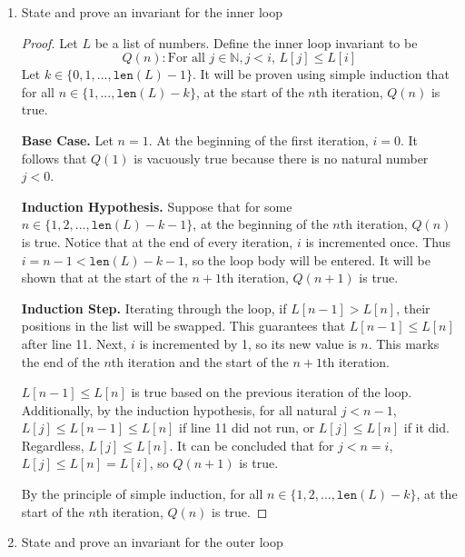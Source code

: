 \documentclass[11pt]{article}
\begin{document}
    \begin{enumerate}[label=(\alph*)]
        \item State and prove an invariant for the inner loop
        
        \begin{proof}
            Let \(L\) be a list of numbers. Define the inner loop invariant to be
            \[
                Q(n): \text{For all } j \in \mathbb{N}, j < i \text{, } L[j] \leq L[i]
            \]
            Let \(k \in \{0,1,..., \texttt{len}(L) - 1\}\). It will be proven using simple induction that for all \(n \in \{1, ..., \texttt{len}(L) - k\}\), at the start of the \(n\)th iteration, \(Q(n)\) is true.

            \textbf{Base Case.} Let \(n=1\). At the beginning of the first iteration, \(i = 0\). It follows that \(Q(1)\) is vacuously true because there is no natural number \(j < 0\).

            \textbf{Induction Hypothesis.} Suppose that for some \(n \in \{1, 2,..., \texttt{len}(L)-k-1\}\), at the beginning of the \(n\)th iteration, \(Q(n)\) is true. Notice that at the end of every iteration, \(i\) is incremented once. Thus \(i = n - 1 < \texttt{len}(L) - k - 1\), so the loop body will be entered. It will be shown that at the start of the \(n+1\)th iteration, \(Q(n+1)\) is true.

            \textbf{Induction Step.} Iterating through the loop, if \(L[n-1] > L[n]\), their positions in the list will be swapped. This guarantees that \(L[n-1] \leq L[n]\) after line 11. Next, \(i\) is incremented by 1, so its new value is \(n\). This marks the end of the \(n\)th iteration and the start of the \(n+1\)th iteration.

            \(L[n-1] \leq L[n]\) is true based on the previous iteration of the loop. Additionally, by the induction hypothesis, for all natural \(j < n-1\), \(L[j] \leq L[n-1] \leq L[n]\) if line 11 did not run, or \(L[j] \leq L[n]\) if it did. Regardless, \(L[j] \leq L[n]\). It can be concluded that for \(j < n = i\), \(L[j] \leq L[n] = L[i]\), so \(Q(n+1)\) is true.

            By the principle of simple induction, for all \(n \in \{1, 2, ..., \texttt{len}(L) - k\}\), at the start of the \(n\)th iteration, \(Q(n)\) is true.

        \end{proof}
        \item State and prove an invariant for the outer loop
        

\end{enumerate}
\end{document}
